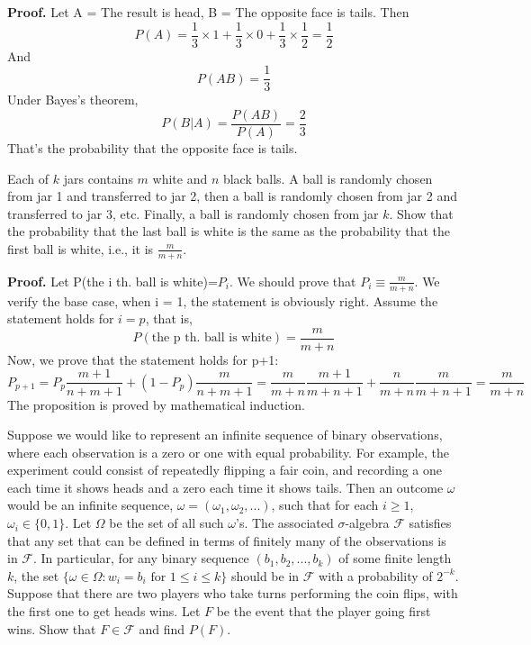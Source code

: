 \documentclass{article}
\begin{document}
    \textbf{Proof.}
    Let A = The result is head, B = The opposite face is tails. Then 
    $$ P(A)=\frac{1}{3}\times 1+\frac{1}{3}\times 0+\frac{1}{3}\times \frac{1}{2}=\frac{1}{2} $$ 
    And 
    $$ P(AB)=\frac{1}{3} $$
    Under Bayes's theorem, 
    $$ P(B|A)=\frac{P(AB)}{P(A)}=\frac{2}{3} $$
    That's the probability that the opposite face is tails.

\begin{question}
Each of \(k\) jars contains \(m\) white and \(n\) black balls. A ball is randomly chosen from jar 1 and transferred to jar 2, then a ball is randomly chosen from jar 2 and transferred to jar 3, etc. Finally, a ball is randomly chosen from jar \(k\). Show that the probability that the last ball is white is the same as the probability that the first ball is white, i.e., it is \( \frac{m}{m + n} \).
\end{question}

    \textbf{Proof.}
    Let P(the i th. ball is white)=$P_i$. We should prove that $P_i\equiv \frac{m}{m+n}$. We verify the base case, when i = 1, the statement is obviously right. Assume the statement holds for $i=p$, that is, 
    $$ P(\text{the p th. ball is white})=\frac{m}{m+n} $$
    Now, we prove that the statement holds for p+1: 
    $$ P_{p+1}=P_p\frac{m+1}{n+m+1}+(1-P_p) \frac{m}{n+m+1}= \frac{m}{m+n}\frac{m+1}{m+n+1}+\frac{n}{m+n}\frac{m}{m+n+1}=\frac{m}{m+n}$$
    The proposition is proved by mathematical induction.

\begin{question}
Suppose we would like to represent an infinite sequence of binary observations, where each observation is a zero or one with equal probability. For example, the experiment could consist of repeatedly flipping a fair coin, and recording a one each time it shows heads and a zero each time it shows tails. Then an outcome \( \omega \) would be an infinite sequence, \( \omega = (\omega_1, \omega_2, ...) \), such that for each \(i \geq 1\), \( \omega_i \in \{0, 1\} \). Let \( \Omega \) be the set of all such \( \omega \)’s. The associated \( \sigma \)-algebra \( \mathcal{F} \) satisfies that any set that can be defined in terms of finitely many of the observations is in \( \mathcal{F} \). In particular, for any binary sequence \( (b_1, b_2, ..., b_k) \) of some finite length \( k \), the set \( \{ \omega \in \Omega : w_i = b_i \text{ for } 1 \leq i \leq k \} \) should be in \( \mathcal{F} \) with a probability of \( 2^{-k} \). Suppose that there are two players who take turns performing the coin flips, with the first one to get heads wins. Let \( F \) be the event that the player going first wins. Show that \( F \in \mathcal{F} \) and find \( P(F) \).
\end{question}
\end{document}

